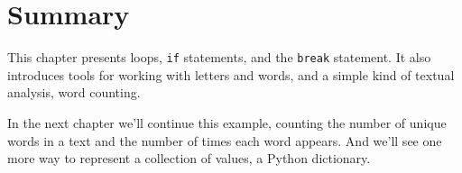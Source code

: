 \hypertarget{summary}{%
\section{Summary}\label{summary}}

This chapter presents loops, \passthrough{\lstinline!if!} statements,
and the \passthrough{\lstinline!break!} statement. It also introduces
tools for working with letters and words, and a simple kind of textual
analysis, word counting.

In the next chapter we'll continue this example, counting the number of
unique words in a text and the number of times each word appears. And
we'll see one more way to represent a collection of values, a Python
dictionary.

